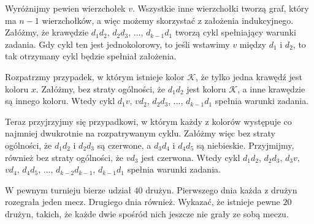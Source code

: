 \vspace{5px}

\noindent
Wyróżnijmy pewien wierzchołek $v$. Wszystkie inne wierzchołki tworzą graf, który ma $n - 1$ wierzchołków, a więc możemy skorzystać z założenia indukcyjnego. Załóżmy, że krawędzie $d_1d_2$, $d_2d_3$, ..., $d_{k-1}d_1$ tworzą cykl spełniający warunki zadania. Gdy cykl ten jest jednokolorowy, to jeśli wstawimy $v$ między $d_1$ i $d_2$, to tak otrzymany cykl będzie spełniał założenia. 

\vspace{5px}

\noindent
Rozpatrzmy przypadek, w którym istnieje kolor $\mathcal{K}$, że tylko jedna krawędź jest koloru $x$. Załóżmy, bez straty ogólności, że $d_1d_2$ jest koloru $\mathcal{K}$, a inne krawędzie są innego koloru. Wtedy cykl $d_1v$, $vd_2$, $d_2d_3$, ..., $d_{k-1}d_1$ spełnia warunki zadania. 

\vspace{5px}

\begin{center}
\end{center}


\noindent
Teraz przyjrzyjmy się przypadkowi, w którym każdy z kolorów występuje co najmniej dwukrotnie na rozpatrywanym cyklu.
Załóżmy więc bez straty ogólności, że $d_1d_2$ i $d_2d_3$ są czerwone, a $d_3d_4$ i $d_4d_5$ są niebieskie. Przyjmijmy, również bez straty ogólności, że $vd_3$ jest czerwona. Wtedy cykl $d_1d_2$, $d_2d_3$, $d_3v$, $vd_4$, $d_4d_5$, ..., $d_{k-2}d_{k-1}$, $d_{k-1}d_1$ spełnia warunki zadania.

\vspace{5px}

\begin{problem}{3}
	W pewnym turnieju bierze udział $40$ drużyn. Pierwszego dnia każda z drużyn rozegrała jeden mecz. Drugiego dnia również. Wykazać, że istnieje pewne $20$ drużyn, takich, że każde dwie spośród nich jeszcze nie grały ze sobą meczu.
\end{problem}

